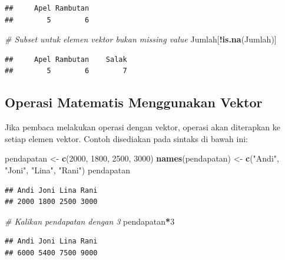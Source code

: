 \documentclass[]{book}
\newenvironment{Shaded}{\begin{snugshade}}{\end{snugshade}}
\newcommand{\CommentTok}[1]{\textcolor[rgb]{0.56,0.35,0.01}{\textit{#1}}}
\newcommand{\DecValTok}[1]{\textcolor[rgb]{0.00,0.00,0.81}{#1}}
\newcommand{\KeywordTok}[1]{\textcolor[rgb]{0.13,0.29,0.53}{\textbf{#1}}}
\newcommand{\NormalTok}[1]{#1}
\newcommand{\OperatorTok}[1]{\textcolor[rgb]{0.81,0.36,0.00}{\textbf{#1}}}
\newcommand{\StringTok}[1]{\textcolor[rgb]{0.31,0.60,0.02}{#1}}
\theoremstyle{definition}
\theoremstyle{definition}
\theoremstyle{definition}
\theoremstyle{remark}
\begin{document}
\begin{verbatim}
##     Apel Rambutan 
##        5        6
\end{verbatim}

\begin{Shaded}
\begin{Highlighting}[]
\CommentTok{# Subset untuk elemen vektor bukan missing value}
\NormalTok{Jumlah[}\OperatorTok{!}\KeywordTok{is.na}\NormalTok{(Jumlah)]}
\end{Highlighting}
\end{Shaded}

\begin{verbatim}
##     Apel Rambutan    Salak 
##        5        6        7
\end{verbatim}

\hypertarget{vectorops}{%
\subsection{Operasi Matematis Menggunakan Vektor}\label{vectorops}}

Jika pembaca melakukan operasi dengan vektor, operasi akan diterapkan ke setiap elemen vektor. Contoh disediakan pada sintaks di bawah ini:

\begin{Shaded}
\begin{Highlighting}[]
\NormalTok{pendapatan <-}\StringTok{ }\KeywordTok{c}\NormalTok{(}\DecValTok{2000}\NormalTok{, }\DecValTok{1800}\NormalTok{, }\DecValTok{2500}\NormalTok{, }\DecValTok{3000}\NormalTok{)}
\KeywordTok{names}\NormalTok{(pendapatan) <-}\StringTok{ }\KeywordTok{c}\NormalTok{(}\StringTok{"Andi"}\NormalTok{, }\StringTok{"Joni"}\NormalTok{, }\StringTok{"Lina"}\NormalTok{, }\StringTok{"Rani"}\NormalTok{)}
\NormalTok{pendapatan}
\end{Highlighting}
\end{Shaded}

\begin{verbatim}
## Andi Joni Lina Rani 
## 2000 1800 2500 3000
\end{verbatim}

\begin{Shaded}
\begin{Highlighting}[]
\CommentTok{# Kalikan pendapatan dengan 3}
\NormalTok{pendapatan}\OperatorTok{*}\DecValTok{3}
\end{Highlighting}
\end{Shaded}

\begin{verbatim}
## Andi Joni Lina Rani 
## 6000 5400 7500 9000
\end{verbatim}
\end{document}
